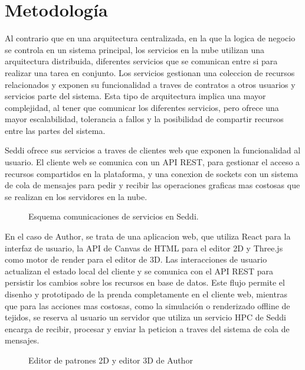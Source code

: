 \chapter{Metodolog\'ia}

  Al contrario que en una arquitectura centralizada, en la que la logica de negocio se controla en un sistema
  principal, los servicios en la nube utilizan una arquitectura distribuida, diferentes servicios que se comunican
  entre si para realizar una tarea en conjunto. Los servicios gestionan una coleccion de recursos relacionados
  y exponen su funcionalidad a traves de contratos a otros usuarios y servicios parte del sistema. Esta tipo de
  arquitectura implica una mayor complejidad, al tener que comunicar los diferentes servicios, pero ofrece una
  mayor escalabilidad, tolerancia a fallos y la posibilidad de compartir recursos entre las partes del sistema.

  Seddi ofrece sus servicios a traves de clientes web que exponen la funcionalidad al usuario. El cliente web se
  comunica con un API REST, para gestionar el acceso a recursos compartidos en la plataforma, y una conexion de
  sockets con un sistema de cola de mensajes para pedir y recibir las operaciones graficas mas costosas que se
  realizan en los servidores en la nube.

  \begin{figure}[H]
    \vspace{1cm}
    \centering
    \caption{Esquema comunicaciones de servicios en Seddi.}
    \vspace{1.5cm}
  \end{figure}

  En el caso de Author, se trata de una aplicacion web, que utiliza React para la interfaz de usuario, la API de
  Canvas de HTML para el editor 2D y Three.js como motor de render para el editor de 3D. Las interacciones de
  usuario actualizan el estado local del cliente y se comunica con el API REST para persistir los cambios sobre
  los recursos en base de datos. Este flujo permite el disenho y prototipado de la prenda completamente en el
  cliente web, mientras que para las acciones mas costosas, como la simulaci\'on o renderizado offline de tejidos,
  se reserva al usuario un servidor que utiliza un servicio HPC de Seddi encarga de recibir, procesar y enviar la
  peticion a traves del sistema de cola de mensajes.


  \begin{figure}[H]
    \vspace{1cm}
    \centering
    \caption{Editor de patrones 2D y editor 3D de Author}
    \vspace{0.5cm}
  \end{figure}


